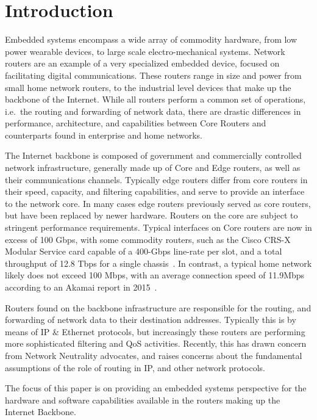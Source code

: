 \section{Introduction}

Embedded systems encompass a wide array of commodity hardware, from low power
wearable devices, to large scale electro-mechanical systems. Network routers
are an example of a very specialized embedded device, focused on facilitating
digital communications. These routers range in size and power from small home
network routers, to the industrial level devices that make up the backbone of
the Internet. While all routers perform a common set of operations, i.e.\ the
routing and forwarding of network data, there are drastic differences in
performance, architecture, and capabilities between Core Routers and
counterparts found in enterprise and home networks.

The Internet backbone is composed of government and commercially controlled
network infrastructure, generally made up of Core and Edge routers, as well as
their communications channels. Typically edge routers differ from core routers
in their speed, capacity, and filtering capabilities, and serve to provide an
interface to the network core. In many cases edge routers previously served as
core routers, but have been replaced by newer hardware. Routers on the core are
subject to stringent performance requirements. Typical interfaces on Core
routers are now in excess of 100 Gbps, with some commodity routers, such as the
Cisco CRS-X Modular Service card capable of a 400-Gbps line-rate per slot, and
a total throughput of 12.8 Tbps for a single chassis~\cite{_cisco_????-1}. In
contrast, a typical home network likely does not exceed 100 Mbps, with an
average connection speed of 11.9Mbps according to an Akamai report in
2015~\cite{gold_u.s._2015}. 

Routers found on the backbone infrastructure are responsible for the routing,
and forwarding of network data to their destination addresses. Typically this
is by means of IP \& Ethernet protocols, but increasingly these routers are
performing more sophisticated filtering and QoS activities. Recently, this has
drawn concern from Network Neutrality advocates, and raises concerns about the
fundamental assumptions of the role of routing in IP, and other network
protocols.

The focus of this paper is on providing an embedded systems perspective for the
hardware and software capabilities available in the routers making up the
Internet Backbone.



